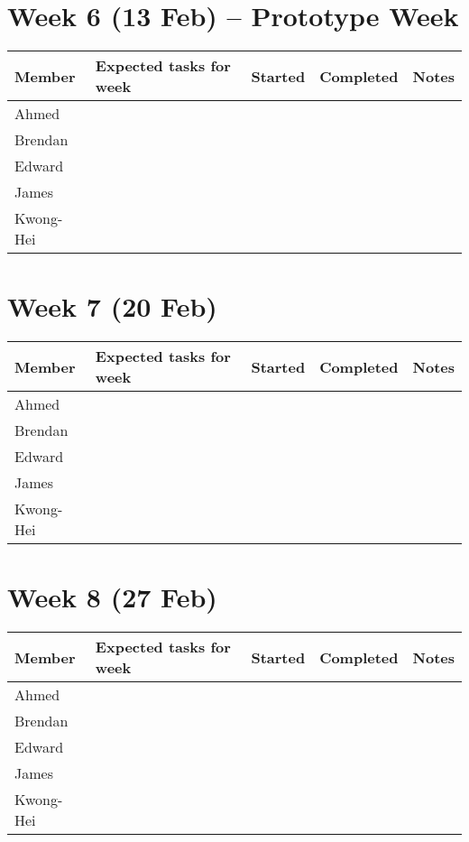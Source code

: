 \documentclass[11pt]{article}
\begin{document}
\section{Week 6 (13 Feb) -- Prototype Week}
\begin{tabularx}{\textwidth}{|l|l|l|l|X|} \hline
Member & Expected tasks for week & Started & Completed & Notes \\ \hline
Ahmed & & & & \\ \hline
Brendan & & & & \\ \hline
Edward & & & & \\ \hline
James & & & & \\ \hline
Kwong-Hei & & & & \\ \hline
\end{tabularx}

\section{Week 7 (20 Feb)}
\begin{tabularx}{\textwidth}{|l|l|l|l|X|} \hline
Member & Expected tasks for week & Started & Completed & Notes \\ \hline
Ahmed & & & & \\ \hline
Brendan & & & & \\ \hline
Edward & & & & \\ \hline
James & & & & \\ \hline
Kwong-Hei & & & & \\ \hline
\end{tabularx}

\section{Week 8 (27 Feb)}
\begin{tabularx}{\textwidth}{|l|l|l|l|X|} \hline
Member & Expected tasks for week & Started & Completed & Notes \\ \hline
Ahmed & & & & \\ \hline
Brendan & & & & \\ \hline
Edward & & & & \\ \hline
James & & & & \\ \hline
Kwong-Hei & & & & \\ \hline
\end{tabularx}
\end{document}
